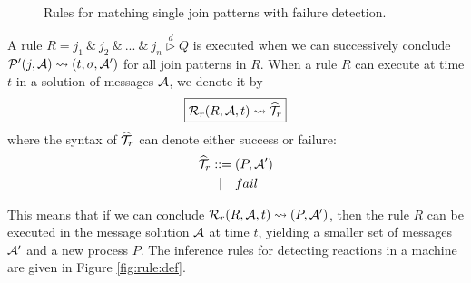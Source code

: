 \begin{figure}[!ht]
\caption{Rules for matching single join patterns with failure detection.\label{fig:rule:join}}
\end{figure}

A rule $R = j_1~\&~j_2~\&~...~\&~j_n \stackrel{d}{\triangleright}Q$ is
executed when we can successively conclude $\mathcal{P}'(j,\mathcal{A}) \leadsto (t,
\sigma, \mathcal{A}')$ for all join patterns in $R$. When a rule $R$ can execute at time
$t$ in a solution of messages $\mathcal{A}$, we denote it by
\begin{equation*}
\boxed{\mathcal{R}_r(R,\mathcal{A},t) \leadsto \widehat{\mathcal{T}}_r}
\end{equation*}
where the syntax of $\widehat{\mathcal{T}}_r$ can denote either success or failure:
\begin{align*}
\widehat{\mathcal{T}}_r ::={}& (P,\mathcal{A}')\\
    |\quad& fail
\end{align*}

This means that if we can conclude $\mathcal{R}_r(R,\mathcal{A},t) \leadsto (P,\mathcal{A}')$, then the
rule $R$ can be executed in the message solution $\mathcal{A}$ at time $t$, yielding a
smaller set of messages $\mathcal{A}'$ and a new process $P$. The inference rules for
detecting reactions in a machine are given in Figure \ref{fig:rule:def}.

